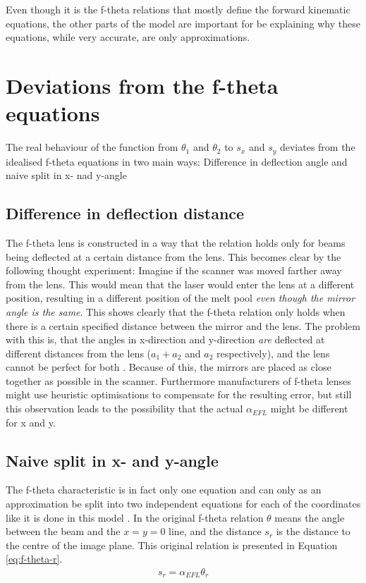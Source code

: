 Even though it is the f-theta relations that mostly define the forward kinematic equations, the other parts of the model are important for be explaining why these equations, while very accurate, are only approximations.

\section{Deviations from the f-theta equations} \label{sec:f-theta-dev}

The real behaviour of the function from $\theta_1$ and $\theta_2$ to $s_x$ and $s_y$ deviates from the idealised f-theta equations in two main ways: Difference in deflection angle and naive split in x- nad y-angle

\subsection{Difference in deflection distance} \label{sec:f-theta-dev-dist}
The f-theta lens is constructed in a way that the relation holds only for beams being deflected at a certain distance from the lens. This becomes clear by the following thought experiment: Imagine if the scanner was moved farther away from the lens. This would mean that the laser would enter the lens at a different position, resulting in a different position of the melt pool \textit{even though the mirror angle is the same}. This shows clearly that the f-theta relation only holds when there is a certain specified distance between the mirror and the lens. The problem with this is, that the angles in x-direction and y-direction \textit{are} deflected at different distances from the lens ($a_1+a_2$ and $a_2$ respectively), and the lens cannot be perfect for both \cite{ftheta-hard}. Because of this, the mirrors are placed as close together as possible in the scanner. Furthermore manufacturers of f-theta lenses might use heuristic optimisations to compensate for the resulting error, but still this observation leads to the possibility that the actual $\alpha_{EFL}$ might be different for x and y.

\subsection{Naive split in x- and y-angle} \label{sec:f-theta-dev-angle}
The f-theta characteristic is in fact only one equation and can only as an approximation be split into two independent equations for each of the coordinates like it is done in this model \cite{correction-cals}. In the original f-theta relation $\theta$ means the angle between the beam and the $x=y=0$ line, and the distance $s_r$ is the distance to the centre of the image plane\cite{thorlabs-ftheta}. This original relation is presented in Equation \ref{eq:f-theta-r}.
\begin{align}
    s_r = \alpha_{EFL} \theta_r
    \label{eq:f-theta-r}
\end{align}

